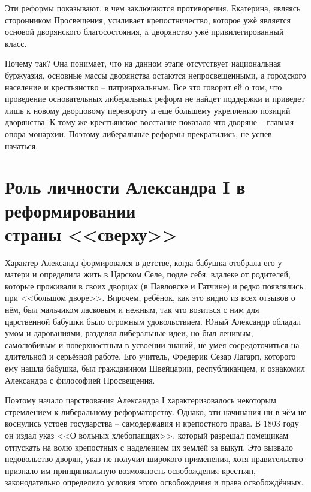 \documentclass[12pt]{article}
\begin{document}
  Эти реформы показывают, в чем заключаются противоречия.
  Екатерина, являясь сторонником Просвещения, усиливает крепостничество,
  которое ужё является основой дворянского благосостояния,
  a дворянство ужё привилегированный класс.

  Почему так? Она понимает, что на данном этапе отсутствует национальная буржуазия, основные массы дворянства остаются непросвещенными,
  а городского население и крестьянство -- патриархальным.
  Все это говорит ей о том, что проведение основательных либеральных реформ не найдет поддержки
  и приведет лишь к новому дворцовому перевороту и еще большему укреплению позиций дворянства.
  К тому же крестьянское восстание показало что дворяне -- главная опора монархии.
  Поэтому либеральные реформы прекратились, не успев начаться.

  \setcounter{section}{3}
  \section{Роль личности Александра I в реформировании \\ страны <<сверху>>}
  Характер Александа формировался в детстве, когда бабушка отобрала его у матери и определила жить в Царском Селе,
  подле себя, вдалеке от родителей, которые проживали в своих дворцах (в Павловске и Гатчине) и редко появлялись при <<большом дворе>>.
  Впрочем, ребёнок, как это видно из всех отзывов о нём, был мальчиком ласковым и нежным,
  так что возиться с ним для царственной бабушки было огромным удовольствием.
  Юный Александр обладал умом и дарованиями, разделял либеральные идеи, но был ленивым,
  самолюбивым и поверхностным в усвоении знаний, не умея сосредоточиться на длительной и серьёзной работе.
  Его учитель, Фредерик Сезар Лагарп, которого ему нашла бабушка,
  был гражданином Швейцарии, республиканцем, и ознакомил Александра с философией Просвещения.

  Поэтому начало царствования Александра I характеризовалось некоторым стремлением к либеральному реформаторству.
  Однако, эти начинания ни в чём не коснулись устоев государства -- самодержавия и крепостного права.
  В 1803 году он издал указ <<О вольных хлебопашцах>>, который разрешал помещикам отпускать на волю крепостных с наделением их землёй за выкуп.
  Это вызвало недовольство дворян, указ не получил широкого применения,
  хотя правительство признало им принципиальную возможность освобождения крестьян,
  законодательно определило условия этого освобождения и права освобождённых.
\end{document}
